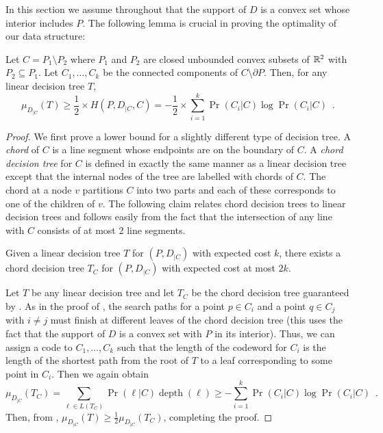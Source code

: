 \documentclass[charterfonts,lotsofwhite]{patmorin}
\DeclareMathOperator{\depth}{depth}
\begin{document}
In this section we assume throughout that the support of $D$ is a
convex set whose interior includes $P$.  The following lemma is
crucial in proving the optimality of our data structure:

\begin{lem}
Let $C=P_1\setminus P_2$ where $P_1$ and $P_2$ are closed unbounded
convex subsets of $\mathbb{R}^2$ with $P_2\subseteq P_1$.  Let
$C_1,\ldots,C_k$ be the connected components of $C\setminus\partial
P$.  Then, for any linear decision tree $T$,
\[
	\mu_{D_{|C}}(T) \ge \frac{1}{2}\times H(P,D_{|C},C) 
		= -\frac{1}{2}
			\times \sum_{i=1}^k \Pr(C_i|C)\log \Pr(C_i|C)
		\enspace .
\]
\end{lem}

\begin{proof} 
We first prove a lower bound for  a slightly different type of
decision tree.  A \emph{chord} of $C$ is a line segment whose
endpoints are on the boundary of $C$.  A \emph{chord decision tree}
for $C$ is defined in exactly the same manner as a linear decision
tree except that the internal nodes of the tree are labelled with
chords of $C$.  The chord at a node $v$ partitions $C$ into two parts
and each of these corresponds to one of the children of $v$.  The
following claim relates chord decision trees to linear decision trees
and follows easily from the fact that the intersection of any line
with $C$ consists of at most 2 line segments.

\begin{clm}
Given a linear decision tree $T$ for $(P,D_{|C})$ with expected cost $k$,
there exists a chord decision tree $T_C$ for $(P,D_{|C})$ with expected cost
at most $2k$. 
\end{clm}

Let $T$ be any linear decision tree and let $T_C$ be the chord
decision tree guaranteed by .  As in the proof of
, the search paths for a point $p\in C_i$ and a
point $q\in C_j$ with $i\neq j$ must finish at different leaves of the
chord decision tree (this uses the fact that the support of $D$ is a
convex set with $P$ in its interior).  Thus, we can assign a code to
$C_1,\ldots,C_k$ such that the length of the codeword for $C_i$ is the
length of the shortest path from the root of $T$ to a leaf
corresponding to some point in $C_i$.  Then we again obtain
\[
  \mu_{D_{|C}}(T_C)
	= \sum_{\ell\in L(T_C)} \Pr(\ell|C)\depth(\ell) 
	\ge -\sum_{i=1}^k \Pr(C_i|C)\log\Pr(C_i|C) \enspace .
\]
Then, from , $\mu_{D_{|C}}(T) \ge
\frac{1}{2}\mu_{D_{|C}}(T_C)$, completing the proof.
\end{proof}
\end{document}
